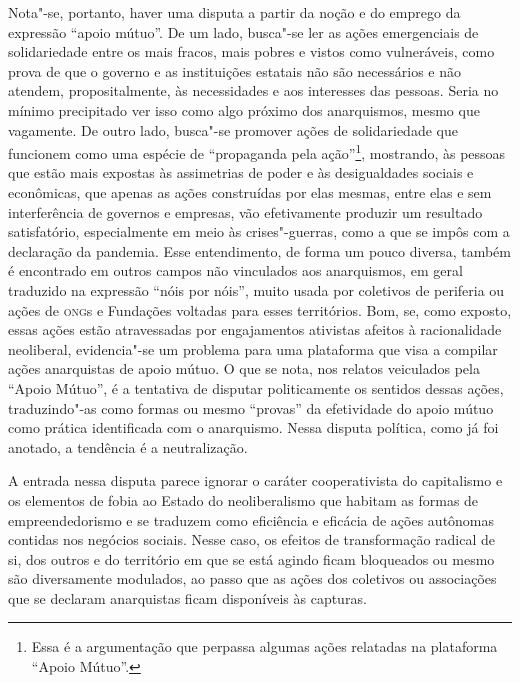 Nota"-se, portanto, haver uma disputa a partir da noção e do emprego da
expressão ``apoio mútuo''. De um lado, busca"-se ler as ações
emergenciais de solidariedade entre os mais fracos, mais pobres e vistos
como vulneráveis, como prova de que o governo e as instituições estatais
não são necessários e não atendem, propositalmente, às necessidades e
aos interesses das pessoas. Seria no mínimo precipitado ver isso como
algo próximo dos anarquismos, mesmo que vagamente. De outro lado,
busca"-se promover ações de solidariedade que funcionem como uma espécie
de ``propaganda pela ação''\footnote{Essa é a argumentação que perpassa
  algumas ações relatadas na plataforma ``Apoio Mútuo''.}, mostrando, às
pessoas que estão mais expostas às assimetrias de poder e às
desigualdades sociais e econômicas, que apenas as ações construídas por
elas mesmas, entre elas e sem interferência de governos e empresas, vão
efetivamente produzir um resultado satisfatório, especialmente em meio
às crises"-guerras, como a que se impôs com a declaração da pandemia.
Esse entendimento, de forma um pouco diversa, também é encontrado em
outros campos não vinculados aos anarquismos, em geral traduzido na
expressão ``nóis por nóis'', muito usada por coletivos de periferia ou
ações de \textsc{ong}s e Fundações voltadas para esses territórios. Bom, se, como
exposto, essas ações estão atravessadas por engajamentos ativistas
afeitos à racionalidade neoliberal, evidencia"-se um problema para uma
plataforma que visa a compilar ações anarquistas de apoio mútuo. O que
se nota, nos relatos veiculados pela ``Apoio Mútuo'', é a tentativa de
disputar politicamente os sentidos dessas ações, traduzindo"-as como
formas ou mesmo ``provas'' da efetividade do apoio mútuo como prática
identificada com o anarquismo. Nessa disputa política, como já foi
anotado, a tendência é a neutralização.

A entrada nessa disputa parece ignorar o caráter cooperativista do
capitalismo e os elementos de fobia ao Estado do neoliberalismo que
habitam as formas de empreendedorismo e se traduzem como eficiência e
eficácia de ações autônomas contidas nos negócios sociais. Nesse caso,
os efeitos de transformação radical de si, dos outros e do território em
que se está agindo ficam bloqueados ou mesmo são diversamente modulados,
ao passo que as ações dos coletivos ou associações que se declaram
anarquistas ficam disponíveis às capturas.

